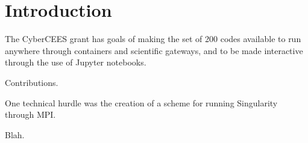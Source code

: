 \section{Introduction}

The CyberCEES grant has goals of making the set of 200 codes available to run anywhere through containers and scientific gateways, and to be made interactive through the use of Jupyter notebooks.

Contributions.

One technical hurdle was the creation of a scheme for running Singularity through MPI.

Blah.
